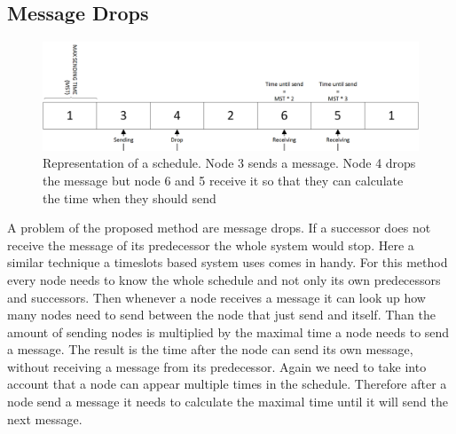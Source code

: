 \subsection{Message Drops}
\label{chp:apr_samplingDrops}
\begin{figure} [htbp]
	\centering         
    \includegraphics[scale=0.6]{content/images/MessageDrop}
    \caption{Representation of a schedule. Node 3 sends a message. Node 4 drops the message but node 6 and 5 receive it so that they can calculate the time when they should send}
    \label{fig:msgDrop}
\end{figure}
A problem of the proposed method are message drops. If a successor does not receive the message of its predecessor the whole system would stop. Here a similar technique a timeslots based system uses comes in handy. For this method every node needs to know the whole schedule and not only its own predecessors and successors. Then whenever a node receives a message it can look up how many nodes need to send between the node that just send and itself. Than the amount of sending nodes is multiplied by the maximal time a node needs to send a message. The result is the time after the node can send its own message, without receiving a message from its predecessor. Again we need to take into account that a node can appear multiple times in the schedule. Therefore after a node send a message it needs to calculate the maximal time until it will send the next message.

